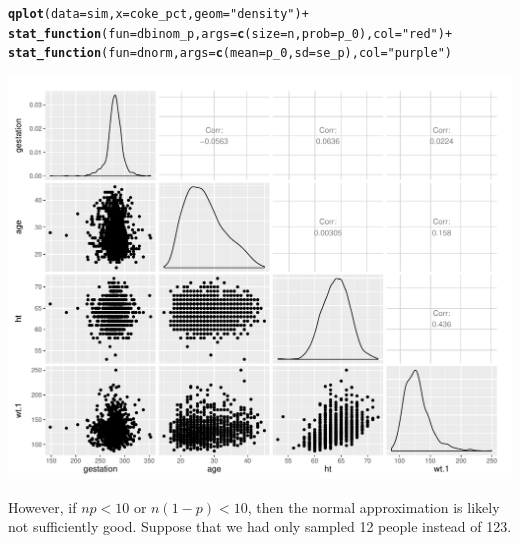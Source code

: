\documentclass[10pt]{article}\usepackage[]{graphicx}\usepackage[]{color}
\makeatletter
\def\maxwidth{ %
  \ifdim\Gin@nat@width>\linewidth
    \linewidth
  \else
    \Gin@nat@width
  \fi
}
\newcommand{\hlstr}[1]{\textcolor[rgb]{0.192,0.494,0.8}{#1}}%
\newcommand{\hlopt}[1]{\textcolor[rgb]{0,0,0}{#1}}%
\newcommand{\hlstd}[1]{\textcolor[rgb]{0.345,0.345,0.345}{#1}}%
\newcommand{\hlkwc}[1]{\textcolor[rgb]{0.333,0.667,0.333}{#1}}%
\newcommand{\hlkwd}[1]{\textcolor[rgb]{0.737,0.353,0.396}{\textbf{#1}}}%
\newenvironment{kframe}{%
 \def\at@end@of@kframe{}%
 \ifinner\ifhmode%
  \def\at@end@of@kframe{\end{minipage}}%
  \begin{minipage}{\columnwidth}%
 \fi\fi%
 \def\FrameCommand##1{\hskip\@totalleftmargin \hskip-\fboxsep
 \colorbox{shadecolor}{##1}\hskip-\fboxsep
     \hskip-\linewidth \hskip-\@totalleftmargin \hskip\columnwidth}%
 \MakeFramed {\advance\hsize-\width
   \@totalleftmargin\z@ \linewidth\hsize
   \@setminipage}}%
 {\par\unskip\endMakeFramed%
 \at@end@of@kframe}
\newenvironment{knitrout}{}{} %
\makeatother
\begin{document}
\begin{knitrout}
\color{fgcolor}\begin{kframe}
\begin{alltt}
\hlkwd{qplot}\hlstd{(}\hlkwc{data} \hlstd{= sim,} \hlkwc{x} \hlstd{= coke_pct,} \hlkwc{geom} \hlstd{=} \hlstr{"density"}\hlstd{)} \hlopt{+}
  \hlkwd{stat_function}\hlstd{(}\hlkwc{fun} \hlstd{= dbinom_p,} \hlkwc{args} \hlstd{=} \hlkwd{c}\hlstd{(}\hlkwc{size} \hlstd{= n,} \hlkwc{prob} \hlstd{= p_0),} \hlkwc{col} \hlstd{=} \hlstr{"red"}\hlstd{)} \hlopt{+}
  \hlkwd{stat_function}\hlstd{(}\hlkwc{fun} \hlstd{= dnorm,} \hlkwc{args} \hlstd{=} \hlkwd{c}\hlstd{(}\hlkwc{mean} \hlstd{= p_0,} \hlkwc{sd} \hlstd{= se_p),} \hlkwc{col} \hlstd{=} \hlstr{"purple"}\hlstd{)}
\end{alltt}
\end{kframe}
\includegraphics[width=\maxwidth]{figure/unnamed-chunk-8-1} 

\end{knitrout}

However, if $np < 10$ or $n(1-p) < 10$, then the normal approximation is likely not sufficiently good. Suppose that we had only sampled 12 people instead of 123. 
\end{document}

